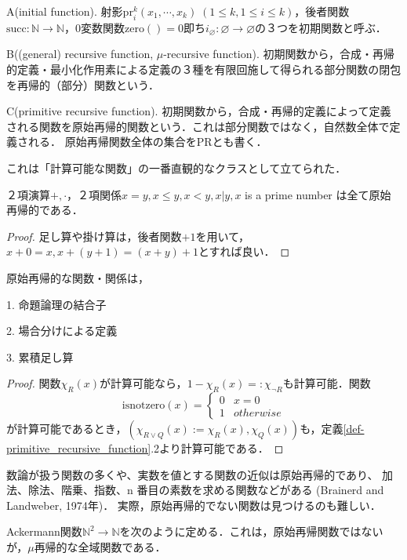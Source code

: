 \documentclass[uplatex, 12pt, dvipdfmx]{jsreport}
\begin{document}
\begin{definition}
    A(initial function). 射影$\mathrm{pr}^k_i(x_1,\cdots,x_k)\;(1\le k, 1\le i\le k)$，後者関数$\mathrm{succ}:\mathbb{N}\to\mathbb{N}$，0変数関数$\mathrm{zero}()=0$即ち$i_\varnothing:\varnothing\to\varnothing$の３つを初期関数と呼ぶ．

    B((general) recursive function, $\mu$-recursive function). 初期関数から，合成・再帰的定義・最小化作用素による定義の３種を有限回施して得られる部分関数の閉包を再帰的（部分）関数という．

    C(primitive recursive function). 初期関数から，合成・再帰的定義によって定義される関数を原始再帰的関数という．これは部分関数ではなく，自然数全体で定義される．
    原始再帰関数全体の集合をPRとも書く．\rightline{$\blacksquare$}
\end{definition}
これは「計算可能な関数」の一番直観的なクラスとして立てられた．

\begin{proposition}
    ２項演算$+,\cdot$，２項関係$x=y, x\le y, x<y, x|y, x$ is a prime number は全て原始再帰的である．
\end{proposition}
\begin{proof}
    足し算や掛け算は，後者関数$+1$を用いて，$x+0=x, x+(y+1)=(x+y)+1$とすれば良い．
\end{proof}
\begin{proposition}
    原始再帰的な関数・関係は，

    1. 命題論理の結合子
    
    2. 場合分けによる定義

    3. 累積足し算
\end{proposition}
\begin{proof}
    関数$\chi_R(x)$が計算可能なら，$1-\chi_R(x)=:\chi_{\lnot R}$も計算可能．関数
    \[ \mathrm{isnotzero}(x)=\begin{cases}
        0 & x=0 \\
        1 & otherwise
    \end{cases} \]が計算可能であるとき，$(\chi_{R\lor Q}(x):=\chi_R(x),\chi_Q(x))$も，定義\ref{def-primitive_recursive_function}.2より計算可能である．
\end{proof}

数論が扱う関数の多くや、実数を値とする関数の近似は原始再帰的であり、
加法、除法、階乗、指数、n 番目の素数を求める関数などがある (Brainerd and Landweber, 1974年)．
実際，原始再帰的でない関数は見つけるのも難しい．

\begin{proposition}
    Ackermann関数$\mathbb{N}^2\to\mathbb{N}$を次のように定める．これは，原始再帰関数ではないが，$\mu$再帰的な全域関数である．
\end{proposition}
\end{document}
